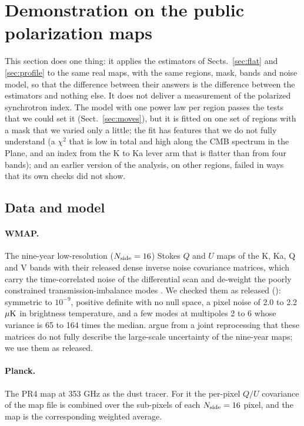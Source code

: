 \section{Demonstration on the public polarization maps}
\label{sec:data}

This section does one thing: it applies the estimators of Sects.~\ref{sec:flat} and \ref{sec:profile}
to the same real maps, with the same regions, mask, bands and noise model, so that the difference
between their answers is the difference between the estimators and nothing else. It does not deliver
a measurement of the polarized synchrotron index. The model with one power law per region passes the
tests that we could set it (Sect.~\ref{sec:moves}), but it is fitted on one set of regions with a mask
that we varied only a little; the fit has features that we do not fully understand (a $\chi^2$ that
is low in total and high along the CMB spectrum in the Plane, and an index from the K to Ka lever arm
that is flatter than from four bands); and an earlier version of the analysis, on other regions,
failed in ways that its own checks did not show.

\subsection{Data and model}

\paragraph{WMAP.} The nine-year low-resolution ($N_{\rm side}=16$) Stokes $Q$ and $U$ maps of the K,
Ka, Q and V bands \citep{bennett2013} with their released dense inverse noise covariance matrices,
which carry the time-correlated noise of the differential scan and de-weight the poorly constrained
transmission-imbalance modes \citep{jarosik2007,jarosik2011}. We checked them as released
(): symmetric to $10^{-9}$, positive definite with no null space, a pixel noise of 2.0
to 2.2 $\mu\mathrm{K}$ in brightness temperature, and a few modes at multipoles 2 to 6 whose variance is 65 to
164 times the median. \citet{watts2023} argue from a joint reprocessing that these matrices do not
fully describe the large-scale uncertainty of the nine-year maps; we use them as released.

\paragraph{Planck.} The PR4 map at 353 GHz \citep{npipe} as the dust tracer. For it the per-pixel $Q/U$ covariance of the map file is combined over the
sub-pixels of each $N_{\rm side}=16$ pixel, and the map is the corresponding weighted average.

